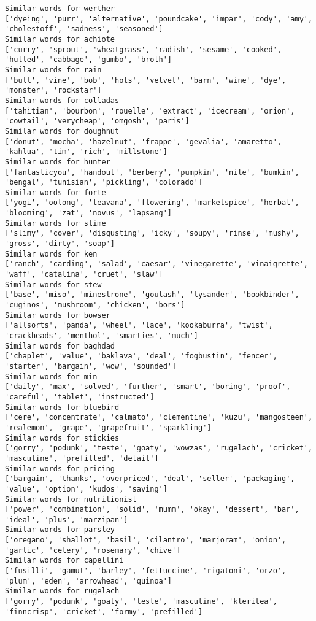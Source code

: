 \documentclass[11pt]{article}
\begin{document}
\begin{Verbatim}[commandchars=\\\{\}]
Similar words for werther
['dyeing', 'purr', 'alternative', 'poundcake', 'impar', 'cody', 'amy', 'cholestoff', 'sadness', 'seasoned']
Similar words for achiote
['curry', 'sprout', 'wheatgrass', 'radish', 'sesame', 'cooked', 'hulled', 'cabbage', 'gumbo', 'broth']
Similar words for rain
['bull', 'vine', 'bob', 'hots', 'velvet', 'barn', 'wine', 'dye', 'monster', 'rockstar']
Similar words for colladas
['tahitian', 'bourbon', 'rouelle', 'extract', 'icecream', 'orion', 'cowtail', 'verycheap', 'omgosh', 'paris']
Similar words for doughnut
['donut', 'mocha', 'hazelnut', 'frappe', 'gevalia', 'amaretto', 'kahlua', 'tim', 'rich', 'millstone']
Similar words for hunter
['fantasticyou', 'handout', 'berbery', 'pumpkin', 'nile', 'bumkin', 'bengal', 'tunisian', 'pickling', 'colorado']
Similar words for forte
['yogi', 'oolong', 'teavana', 'flowering', 'marketspice', 'herbal', 'blooming', 'zat', 'novus', 'lapsang']
Similar words for slime
['slimy', 'cover', 'disgusting', 'icky', 'soupy', 'rinse', 'mushy', 'gross', 'dirty', 'soap']
Similar words for ken
['ranch', 'carding', 'salad', 'caesar', 'vinegarette', 'vinaigrette', 'waff', 'catalina', 'cruet', 'slaw']
Similar words for stew
['base', 'miso', 'minestrone', 'goulash', 'lysander', 'bookbinder', 'cuginos', 'mushroom', 'chicken', 'bors']
Similar words for bowser
['allsorts', 'panda', 'wheel', 'lace', 'kookaburra', 'twist', 'crackheads', 'menthol', 'smarties', 'much']
Similar words for baghdad
['chaplet', 'value', 'baklava', 'deal', 'fogbustin', 'fencer', 'starter', 'bargain', 'wow', 'sounded']
Similar words for min
['daily', 'max', 'solved', 'further', 'smart', 'boring', 'proof', 'careful', 'tablet', 'instructed']
Similar words for bluebird
['cere', 'concentrate', 'calmato', 'clementine', 'kuzu', 'mangosteen', 'realemon', 'grape', 'grapefruit', 'sparkling']
Similar words for stickies
['gorry', 'podunk', 'teste', 'goaty', 'wowzas', 'rugelach', 'cricket', 'masculine', 'prefilled', 'detail']
Similar words for pricing
['bargain', 'thanks', 'overpriced', 'deal', 'seller', 'packaging', 'value', 'option', 'kudos', 'saving']
Similar words for nutritionist
['power', 'combination', 'solid', 'mumm', 'okay', 'dessert', 'bar', 'ideal', 'plus', 'marzipan']
Similar words for parsley
['oregano', 'shallot', 'basil', 'cilantro', 'marjoram', 'onion', 'garlic', 'celery', 'rosemary', 'chive']
Similar words for capellini
['fusilli', 'gamut', 'barley', 'fettuccine', 'rigatoni', 'orzo', 'plum', 'eden', 'arrowhead', 'quinoa']
Similar words for rugelach
['gorry', 'podunk', 'goaty', 'teste', 'masculine', 'kleritea', 'finncrisp', 'cricket', 'formy', 'prefilled']

\end{Verbatim}
\end{document}
